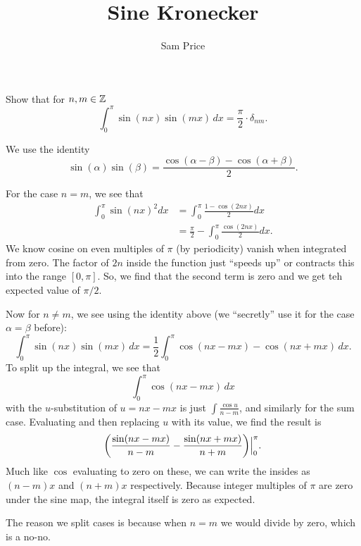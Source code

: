 \documentclass{article}
\author{Sam Price}
\title{Sine Kronecker}
\begin{document}
\maketitle

Show that for $n, m \in \mathbb{Z}^{}$
\[ \int_{0}^{\pi}\sin(nx)\sin(mx)\, dx = \frac{\pi}{2} \cdot \delta_{nm}. \]

We use the identity
\[ \sin(\alpha)\sin(\beta) = \frac{\cos(\alpha - \beta) - \cos(\alpha + \beta)}{2}. \]

For the case $n = m$, we see that
\begin{align*}
  \int_{0}^{\pi}\sin(nx)^{2}dx &= \int_{0}^{\pi}\frac{1 - \cos(2nx)}{2}dx\\
  &= \frac{\pi}{2} - \int_{0}^{\pi}\frac{\cos(2nx)}{2}dx.
\end{align*}
We know cosine on even multiples of $\pi$ (by periodicity) vanish when integrated from zero.
The factor of $2n$ inside the function just ``speeds up'' or contracts this into the range $[0, \pi]$.
So, we find that the second term is zero and we get teh expected value of $\pi/2$.

Now for $n \ne m$, we see using the identity above (we ``secretly'' use it for the case $\alpha = \beta$ before):
\[
  \int_{0}^{\pi} \sin(nx)\sin(mx)\,dx = \frac{1}{2}\int_{0}^{\pi}\cos(nx - mx) - \cos(nx + mx) \, dx.
\]
To split up the integral, we see that
\[ \int_{0}^{\pi} \cos(nx - mx)\,dx \]
with the $u$-substitution of $u = nx - mx$ is just $\int \frac{\cos u}{n - m}$, and similarly for the sum case.
Evaluating and then replacing $u$ with its value, we find the result is
\[ \pars*{\frac{\sin(nx - mx)}{n - m} - \frac{\sin(nx + mx)}{n + m}}\Big|_{0}^{\pi}. \]
Much like $\cos$ evaluating to zero on these, we can write the insides as $(n - m)x$ and $(n + m)x$ respectively.
Because integer multiples of $\pi$ are zero under the sine map, the integral itself is zero as expected.

The reason we split cases is because when $n = m$ we would divide by zero, which is a no-no.
\end{document}
